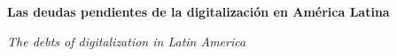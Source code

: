 
\renewcommand{\articuloidiomaxml}{es}
\renewcommand{\articulotitulo}{Las deudas pendientes de la digitalización en América Latina}
\renewcommand{\articuloautores}{Las Gentes}
\renewcommand{\articulodoi}{10.24215/18522971e133}
\renewcommand{\articulotipo}{EDITORIAL}
\renewcommand{\articulorevista}{Revista Revistas}
\renewcommand{\articuloissne}{1515-1573}
\renewcommand{\articulovolumen}{1}
\renewcommand{\articulonumero}{1}
\renewcommand{\articulofecha}{ 2026}
\renewcommand{\articulopagina}{0}

\setcounter{page}{0}
\thispagestyle{firstpage}

\noindent\begin{minipage}[t]{\dimexpr\textwidth+\marginparsep+\marginparwidth\relax}%
{\sffamily\bfseries\Large\articulotitulo\par}%
\end{minipage}\par
\vspace{3mm}%
\renewcommand{\articulotitulotrans}{The debts of digitalization in Latin America}
\noindent\begin{minipage}[t]{\dimexpr\textwidth+\marginparsep+\marginparwidth\relax}%
{\sffamily\itshape\normalsize\articulotitulotrans\par}%
\end{minipage}\par
\vspace{4mm}%

